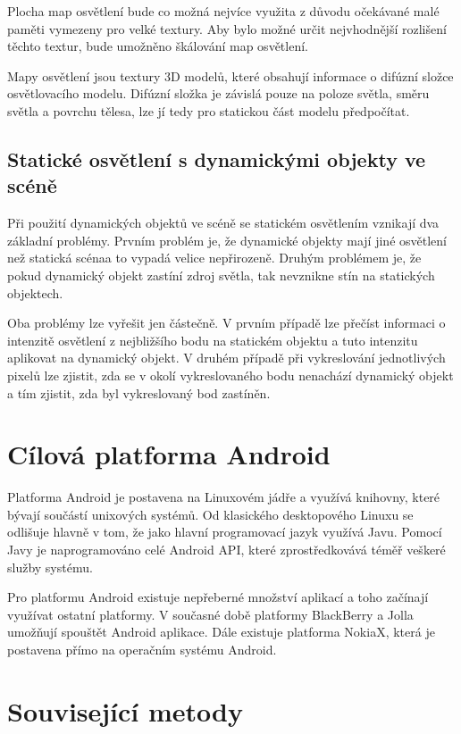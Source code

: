 \documentclass[11pt,twoside,a4paper]{book}
\begin{document}
Plocha map osvětlení bude co možná nejvíce využita z důvodu očekávané malé paměti vymezeny pro velké textury. Aby bylo možné určit nejvhodnější rozlišení těchto textur, bude umožněno škálování map osvětlení.

Mapy osvětlení jsou textury 3D modelů, které obsahují informace o difúzní složce osvětlovacího modelu. Difúzní složka je závislá pouze na poloze světla, směru světla a povrchu tělesa, lze jí tedy pro statickou část modelu předpočítat.

\subsection{Statické osvětlení s dynamickými objekty ve scéně}
Při použití dynamických objektů ve scéně se statickém osvětlením vznikají dva základní problémy. Prvním problém je, že dynamické objekty mají jiné osvětlení než statická scéna\linebreak a to vypadá velice nepřirozeně. Druhým problémem je, že pokud dynamický objekt zastíní zdroj světla, tak nevznikne stín na statických objektech.

Oba problémy lze vyřešit jen částečně. V prvním případě lze přečíst informaci o intenzitě osvětlení z nejbližšího bodu na statickém objektu a tuto intenzitu aplikovat na dynamický objekt. V druhém případě při vykreslování jednotlivých pixelů lze zjistit, zda se v okolí vykreslovaného bodu nenachází dynamický objekt a tím zjistit, zda byl vykreslovaný bod zastíněn.

\section{Cílová platforma Android}
Platforma Android je postavena na Linuxovém jádře a využívá knihovny, které bývají součástí unixových systémů. Od klasického desktopového Linuxu se odlišuje hlavně v tom, že jako hlavní programovací jazyk využívá Javu. Pomocí Javy je naprogramováno celé Android API, které zprostředkovává téměř veškeré služby systému.

Pro platformu Android existuje nepřeberné množství aplikací a toho začínají využívat ostatní platformy. V současné době platformy BlackBerry a Jolla umožňují spouštět Android aplikace. Dále existuje platforma NokiaX, která je postavena přímo na operačním systému Android.

\section{Související metody}
\end{document}
